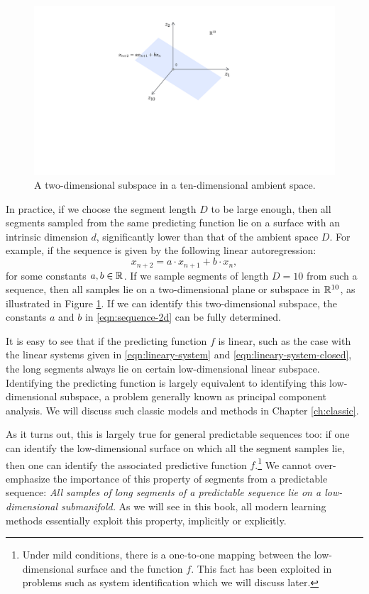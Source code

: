 \documentclass[../../book-main.tex]{subfiles}
\begin{document}
\begin{figure}[t]
\centering
\includegraphics[width=0.6\linewidth]{figures/two-dimensional plane in R10.pdf}
    \caption{A two-dimensional subspace in a ten-dimensional ambient space.}
    \label{fig:lowdimplane}
\end{figure}
In practice, if we choose the segment length $D$ to be large enough, then all segments sampled from the same predicting function lie on a surface with an intrinsic dimension $d$, significantly lower than that of the ambient space $D$. For example, if the sequence is given by the following linear autoregression:
\begin{equation}
    x_{n+2} = a\cdot x_{n+1} + b\cdot x_n,
    \label{eqn:sequence-2d}
\end{equation}
for some constants $a, b \in \mathbb{R}$. If we sample segments of length $D =10$ from such a sequence, then all samples lie on a two-dimensional plane or subspace in $\mathbb{R}^{10}$, as illustrated in Figure \ref{fig:lowdimplane}. If we can identify this two-dimensional subspace, the constants $a$ and $b$ in \eqref{eqn:sequence-2d} can be fully determined. 


It is easy to see that if the predicting function $f$ is linear, such as the case with the linear systems given in \eqref{eqn:lineary-system} and \eqref{eqn:lineary-system-closed}, the long segments always lie on certain low-dimensional linear subspace. Identifying the predicting function is largely equivalent to identifying this low-dimensional subspace, a problem generally known as principal component analysis. We will discuss such classic models and methods in Chapter \ref{ch:classic}.

As it turns out, this is largely true for general predictable sequences too: if one can identify the low-dimensional surface on which all the segment samples lie, then one can identify the associated predictive function $f$.\footnote{Under mild conditions, there is a one-to-one mapping between the low-dimensional surface and the function $f$. This fact has been exploited in problems such as system identification which we will discuss later.} We cannot over-emphasize the importance of this property of segments from a predictable sequence: {\em All samples of long segments of a predictable sequence lie on a low-dimensional submanifold.} As we will see in this book, all modern learning methods essentially exploit this property, implicitly or explicitly. %
\end{document}
